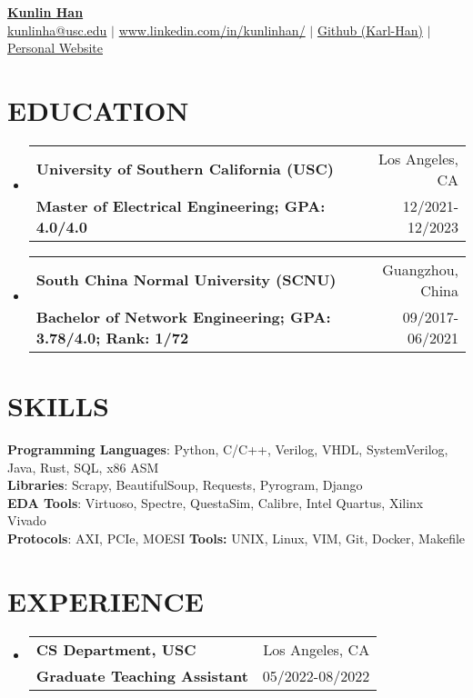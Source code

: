 \documentclass[letterpaper,11pt]{article}
\makeatletter
\newcommand{\resumeSubheading}[4]{
  \vspace{-1pt}\item
    \begin{tabular*}{0.97\textwidth}[t]{l@{\extracolsep{\fill}}r}
      \textbf{#1} & #2 \\
      \textbf{\small#3} & \small{#4} \\
    \end{tabular*}\vspace{-10pt}
}
\newcommand{\resumeSubHeadingListStart}{\begin{itemize}[leftmargin=*]}
\newcommand{\resumeSubHeadingListEnd}{\end{itemize}\vspace{-5pt}}
\makeatother
\begin{document}
\textbf{\href{https://www.linkedin.com/in/kunlinhan/}{\LARGE {Kunlin Han}}} \\
{
    \href{mailto:{kunlinha@usc.edu}}{{kunlinha@usc.edu}} $|$ \href{https://www.linkedin.com/in/kunlinhan/}{www.linkedin.com/in/kunlinhan/} $|$ \href{https://github.com/Karl-Han}{Github (Karl-Han)}  $|$ \href{https://www.iwktd.com/}{Personal Website} 
}\section{EDUCATION}
\resumeSubHeadingListStart
\resumeSubheading
    {University of Southern California (USC)}{Los Angeles, CA}
    {Master of Electrical Engineering; GPA: 4.0/4.0
}{12/2021-12/2023}
\resumeSubheading
    {South China Normal University (SCNU)}{Guangzhou, China}
    {Bachelor of Network Engineering; GPA: 3.78/4.0; Rank: 1/72
}{09/2017-06/2021}
\resumeSubHeadingListEnd



\section{SKILLS}
\textbf{Programming Languages}: Python, C/C++, Verilog, VHDL, SystemVerilog, Java, Rust, SQL, x86 ASM\\ 
\textbf{Libraries}: Scrapy, BeautifulSoup, Requests, Pyrogram, Django\\ 
\textbf{EDA Tools}: Virtuoso, Spectre, QuestaSim, Calibre, Intel Quartus, Xilinx Vivado\\ 
\textbf{Protocols}: AXI, PCIe, MOESI \hspace{\fill} \textbf{Tools:} UNIX, Linux, VIM, Git, Docker, Makefile\\ 


\section{EXPERIENCE}
\resumeSubHeadingListStart
\resumeSubheading
    {CS Department, USC}{Los Angeles, CA}
    {Graduate Teaching Assistant}{05/2022-08/2022}
\resumeSubHeadingListEnd
\end{document}
